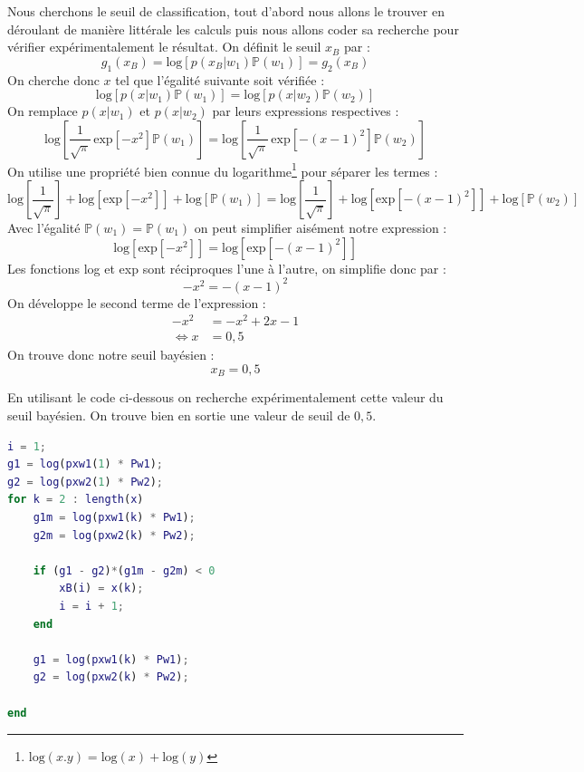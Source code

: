 \documentclass[11pt,a4paper]{article}
\begin{document}
Nous cherchons le seuil de classification, tout d'abord nous allons le trouver en déroulant de manière littérale les calculs puis nous allons coder sa recherche pour vérifier expérimentalement le résultat. On définit le seuil $x_B$ par :
\begin{equation}
g_1(x_B) = \text{log}\left[p(x_B|w_1)\mathbb{P}(w_1)\right] = g_2(x_B)
\label{eq.def.seuil.bay}
\end{equation}
On cherche donc $x$ tel que l'égalité suivante soit vérifiée :
$$
\text{log}\left[p(x|w_1)\mathbb{P}(w_1)\right] = \text{log}\left[p(x|w_2)\mathbb{P}(w_2)\right]
$$
On remplace $p(x|w_1)$ et $p(x|w_2)$ par leurs expressions respectives :
$$
\text{log}\left[\frac{1}{\sqrt{\pi}}\,\text{exp}\left[-x^2\right]\mathbb{P}(w_1)\right] = \text{log}\left[\frac{1}{\sqrt{\pi}}\,\text{exp}\left[-(x-1)^2\right]\mathbb{P}(w_2)\right]
$$
On utilise une propriété bien connue du logarithme\footnote{$\text{log}(x.y) = \text{log}(x) + \text{log}(y)$} pour séparer les termes :
$$
\text{log}\left[\frac{1}{\sqrt{\pi}}\right] + \text{log}\left[\text{exp}\left[-x^2\right]\right] + \text{log}\left[\mathbb{P}(w_1)\right] = \text{log}\left[\frac{1}{\sqrt{\pi}}\right] + \text{log}\left[\text{exp}\left[-(x-1)^2\right]\right] + \text{log}\left[\mathbb{P}(w_2)\right]
$$
Avec l'égalité $\mathbb{P}(w_1) = \mathbb{P}(w_1)$ on peut simplifier aisément notre expression :
$$
\text{log}\left[\text{exp}\left[-x^2\right]\right] = \text{log}\left[\text{exp}\left[-(x-1)^2\right]\right]
$$
Les fonctions log et exp sont réciproques l'une à l'autre, on simplifie donc par :
$$
-x^2 = -(x-1)^2
$$
On développe le second terme de l'expression :
\begin{align*}
-x^2 &= -x^2 + 2x - 1 \\
\Leftrightarrow x &= 0,5
\end{align*}
On trouve donc notre seuil bayésien :
$$
x_B = 0,5
$$

En utilisant le code ci-dessous on recherche expérimentalement cette valeur du seuil bayésien. On trouve bien en sortie une valeur de seuil de $0,5$.

\noindent\hrulefill
\begin{lstlisting}[language=matlab]
i = 1;
g1 = log(pxw1(1) * Pw1);
g2 = log(pxw2(1) * Pw2);
for k = 2 : length(x)
    g1m = log(pxw1(k) * Pw1);
    g2m = log(pxw2(k) * Pw2);
    
    if (g1 - g2)*(g1m - g2m) < 0
        xB(i) = x(k);
        i = i + 1;
    end
    
    g1 = log(pxw1(k) * Pw1);
    g2 = log(pxw2(k) * Pw2);
    
end
\end{lstlisting}
\noindent\hrulefill
\end{document}
